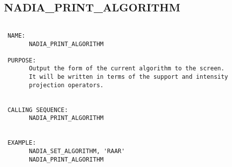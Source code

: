   
 
\subsection{NADIA\_PRINT\_ALGORITHM}
\begin{verbatim}

 NAME:
       NADIA_PRINT_ALGORITHM

 PURPOSE:
       Output the form of the current algorithm to the screen. 
       It will be written in terms of the support and intensity
       projection operators.


 CALLING SEQUENCE:
       NADIA_PRINT_ALGORITHM


 EXAMPLE:
       NADIA_SET_ALGORITHM, 'RAAR'
       NADIA_PRINT_ALGORITHM

\end{verbatim}



  
 
